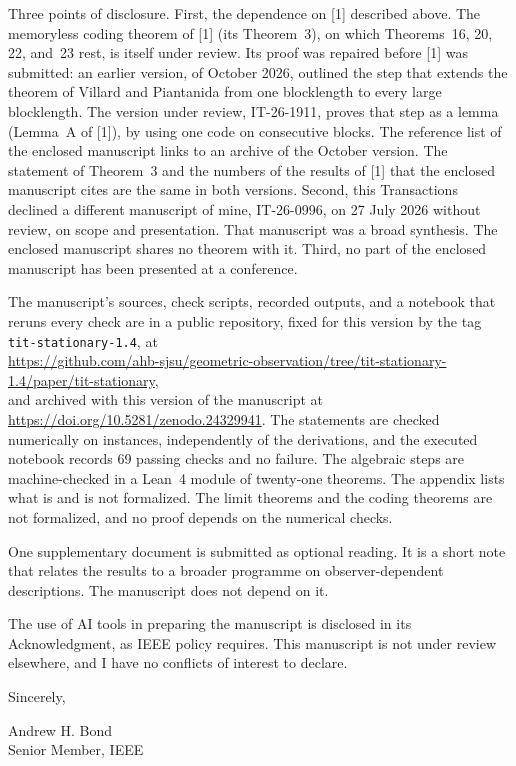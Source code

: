 \documentclass[11pt]{article}
\begin{document}
Three points of disclosure. First, the dependence on [1] described
above. The memoryless coding theorem of [1] (its Theorem~3), on which
Theorems~16, 20, 22, and~23 rest, is itself under review. Its proof was
repaired before [1] was submitted: an earlier version, of October 2026,
outlined the step that extends the theorem of Villard and Piantanida
from one blocklength to every large blocklength. The version under
review, IT-26-1911, proves that step as a lemma (Lemma~A of [1]), by
using one code on consecutive blocks. The reference list of the enclosed
manuscript links to an archive of the October version. The statement of
Theorem~3 and the numbers of the results of [1] that the enclosed
manuscript cites are the same in both versions.
Second, this Transactions declined a different manuscript of mine,
IT-26-0996, on 27 July 2026 without review, on scope and presentation.
That manuscript was a broad synthesis. The enclosed manuscript shares no
theorem with it. Third, no part of the enclosed manuscript has been
presented at a conference.

The manuscript's sources, check scripts, recorded outputs, and a
notebook that reruns every check are in a public repository, fixed for
this version by the tag \texttt{tit-stationary-1.4}, at\\
{\footnotesize\url{https://github.com/ahb-sjsu/geometric-observation/tree/tit-stationary-1.4/paper/tit-stationary}},\\
and archived with this version of the manuscript at
\url{https://doi.org/10.5281/zenodo.24329941}.
The statements are checked numerically on instances, independently of
the derivations, and the executed notebook records 69 passing checks and
no failure. The algebraic steps are machine-checked in a Lean~4 module
of twenty-one theorems. The appendix lists what is and is not
formalized. The limit theorems and the coding theorems are not
formalized, and no proof depends on the numerical checks.

One supplementary document is submitted as optional reading. It is a
short note that relates the results to a broader programme on
observer-dependent descriptions. The manuscript does not depend on it.

The use of AI tools in preparing the manuscript is disclosed in its
Acknowledgment, as IEEE policy requires. This manuscript is not under
review elsewhere, and I have no conflicts of interest to declare.

Sincerely,

Andrew H. Bond\\
Senior Member, IEEE
\end{document}

